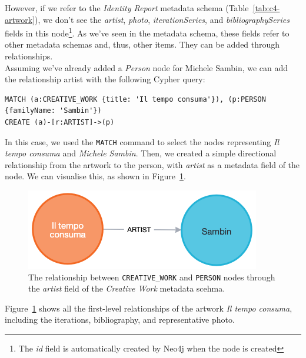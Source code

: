 However, if we refer to the \textit{Identity Report} metadata schema (Table~\ref{tab:c4-artwork}), we don’t see the \textit{artist}, \textit{photo}, \textit{iterationSeries}, and \textit{bibliographySeries} fields in this node\footnote{The \textit{id} field is automatically created by Neo4j when the node is created}. As we’ve seen in the metadata schema, these fields refer to other metadata schemas and, thus, other items. They can be added through relationships.\\
Assuming we’ve already added a \textit{Person} node for Michele Sambin, we can add the relationship artist with the following Cypher query:
\begin{lstlisting}[style=cypher]
MATCH (a:CREATIVE_WORK {title: 'Il tempo consuma'}), (p:PERSON {familyName: 'Sambin'})
CREATE (a)-[r:ARTIST]->(p)
\end{lstlisting}
In this case, we used the \texttt{MATCH} command to select the nodes representing \textit{Il tempo consuma} and \textit{Michele Sambin}. Then, we created a simple directional relationship from the artwork to the person, with \textit{artist} as a metadata field of the  node. We can visualise this, as shown in Figure~\ref{fig:c4-neo4j-artworkrelation}.

\begin{figure}[!h]
    \centering
    \includegraphics[width=0.5\linewidth]{chapters/4-MDC_model_application/image/neo4j-singlerelationship.png}
    \caption{The relationship between \texttt{CREATIVE\_WORK} and \texttt{PERSON} nodes through the \textit{artist} field of the \textit{Creative Work} metadata scehma.}
    \label{fig:c4-neo4j-artworkrelation}
\end{figure}

Figure~\ref{fig:c4-neo4j-artworkrelation} shows all the first-level relationships of the artwork \textit{Il tempo consuma}, including the iterations, bibliography, and representative photo.


